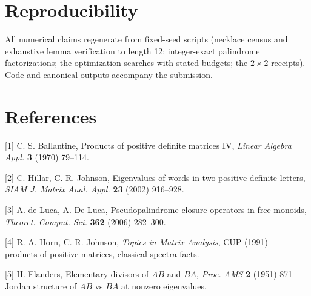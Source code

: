 \documentclass[11pt]{article}
\begin{document}
\section*{Reproducibility}
All numerical claims regenerate from fixed-seed scripts (necklace census and exhaustive lemma verification to length 12; integer-exact palindrome factorizations; the optimization searches with stated budgets; the $2\times 2$ receipts).  Code and canonical outputs accompany the submission.

\section*{References}
[1] C. S. Ballantine, Products of positive definite matrices IV, \emph{Linear Algebra Appl.} \textbf{3} (1970) 79–114.

[2] C. Hillar, C. R. Johnson, Eigenvalues of words in two positive definite letters, \emph{SIAM J. Matrix Anal. Appl.} \textbf{23} (2002) 916–928.

[3] A. de Luca, A. De Luca, Pseudopalindrome closure operators in free monoids, \emph{Theoret. Comput. Sci.} \textbf{362} (2006) 282–300.

[4] R. A. Horn, C. R. Johnson, \emph{Topics in Matrix Analysis}, CUP (1991) — products of positive matrices, classical spectra facts.

[5] H. Flanders, Elementary divisors of $AB$ and $BA$, \emph{Proc. AMS} \textbf{2} (1951) 871 — Jordan structure of $AB$ vs $BA$ at nonzero eigenvalues.
\end{document}
